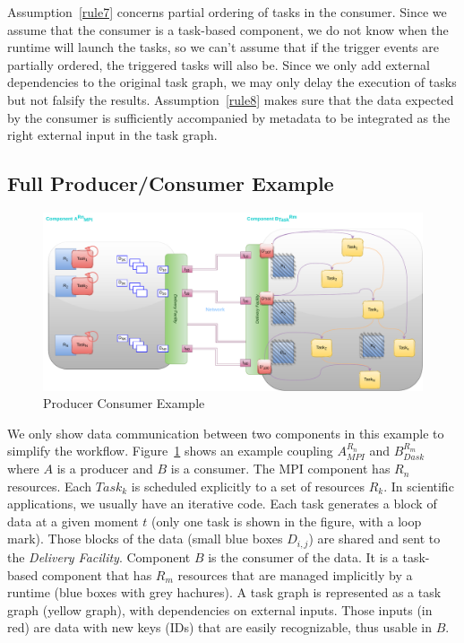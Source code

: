 {Assumption~\ref{rule7} concerns partial ordering of \deisa tasks in the consumer. Since we assume that the consumer is a task-based component, we do not know when the runtime will launch the tasks, so we can't assume that if the trigger events are partially ordered, the triggered tasks will also be. Since we only add external dependencies to the original task graph, we may only delay the execution of tasks but not falsify the results.     
Assumption~\ref{rule8} makes sure that the data expected by the consumer is sufficiently accompanied by metadata to be integrated as the right external input in the task graph.
}

\subsection{Full Producer/Consumer Example}\label{sec:btp:FullPCExample}
 
\begin{figure}[tb]\centering
\includegraphics[width=\columnwidth]{figures/BTP.pdf}
\caption{Producer Consumer Example}
\label{figBTP}
\end{figure}

We only show data communication between two \deisa components in this example to simplify the workflow.
Figure~\ref{figBTP} shows an example coupling $A_{MPI}^{R_{n}}$ and $B_{Dask}^{R_{m}}$ where $A$ is a producer and $B$ is a consumer. The MPI component has $R_{n}$ resources. Each $Task_k$ is scheduled explicitly to a set of resources $R_{k}$. In scientific applications, we usually have an iterative code. Each task generates a block of data at a given moment $t$ (only one task is shown in the figure, with a loop mark). Those blocks of the data (small blue boxes $D_{i,j}$) are shared and sent to the \textit{Delivery Facility}.
Component $B$ is the consumer of the data. It is a task-based component that has $R_{m}$ resources that are managed implicitly by a runtime (blue boxes with grey hachures). A task graph is represented as a \deisa task graph (yellow graph), with dependencies on external inputs. Those inputs (in red) are data with new keys (IDs) that are easily recognizable, thus usable in $B$.  


